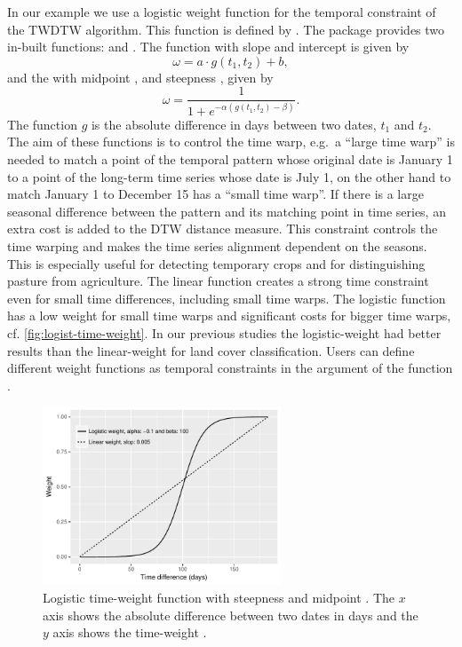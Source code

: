 \documentclass[article,shortnames]{jss}
\begin{document}
In our example we use a logistic weight function for the temporal
constraint of the TWDTW algorithm. This function is defined by
. The  package provides two in-built
functions:  and . The
 function with slope  and intercept 
is given by \[
    \omega = a \cdot g(t_1,t_2) + b,
    \label{eq:lineartw}
\] and the  with midpoint , and
steepness , given by \[
    \omega = \frac{1}{1 + e^{-\alpha(g(t_1,t_2)-\beta)} }.
    \label{eq:nonlineartw}
\] The function \(g\) is the absolute difference in days between two
dates, \(t_1\) and \(t_2\). The aim of these functions is to control the
time warp, e.g.~a ``large time warp'' is needed to match a point of the
temporal pattern whose original date is January 1 to a point of the
long-term time series whose date is July 1, on the other hand to match
January 1 to December 15 has a ``small time warp''. If there is a large
seasonal difference between the pattern and its matching point in time
series, an extra cost is added to the DTW distance measure. This
constraint controls the time warping and makes the time series alignment
dependent on the seasons. This is especially useful for detecting
temporary crops and for distinguishing pasture from agriculture. The
linear function creates a strong time constraint even for small time
differences, including small time warps. The logistic function has a low
weight for small time warps and significant costs for bigger time warps,
cf. \autoref{fig:logist-time-weight}. In our previous studies
\citep{Maus:2016} the logistic-weight had better results than the
linear-weight for land cover classification. Users can define different
weight functions as temporal constraints in the argument
 of the function .

\begin{CodeChunk}
\begin{figure}[!h]

{\centering \includegraphics[width=2.7952755in]{applying_twdtw_files/figure-latex/logist-time-weight-1} 

}

\caption{Logistic time-weight function  with steepness  and midpoint . The $x$ axis shows the absolute difference between two dates in days and the $y$ axis shows the time-weight \citep{Maus:2016}.}\label{fig:logist-time-weight}
\end{figure}
\end{CodeChunk}
\end{document}
